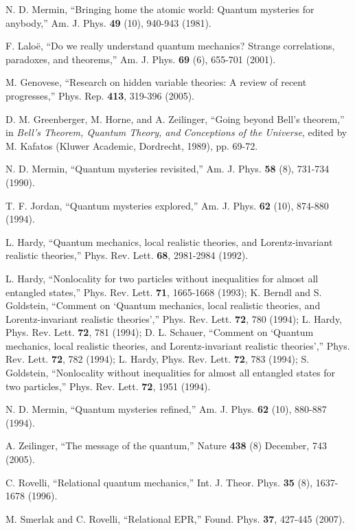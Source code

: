 \documentclass[12pt]{article}
\begin{document}
\begin{thebibliography}{99}
N. D. Mermin,
``Bringing home the atomic world: Quantum mysteries for anybody,''
Am. J. Phys. {\bf 49} (10), 940-943 (1981).

F. Lalo\"e,
``Do we really understand quantum mechanics?
Strange correlations, paradoxes, and theorems,''
Am. J. Phys. {\bf 69} (6), 655-701 (2001).

M. Genovese,
``Research on hidden variable theories: A review of recent progresses,''
Phys. Rep. {\bf 413}, 319-396 (2005).

D. M. Greenberger, M. Horne, and A. Zeilinger,
``Going beyond Bell's theorem,''
in {\it Bell's Theorem, Quantum Theory, and Conceptions 
of the Universe}, edited by M. Kafatos (Kluwer Academic, Dordrecht, 1989),
pp. 69-72. 

N. D. Mermin,
``Quantum mysteries revisited,''
Am. J. Phys. {\bf 58} (8), 731-734 (1990).

T. F. Jordan,
``Quantum mysteries explored,''
Am. J. Phys. {\bf 62} (10), 874-880 (1994).

L. Hardy,
``Quantum mechanics, local realistic theories, and 
Lorentz-invariant realistic theories,''
Phys. Rev. Lett. {\bf 68}, 2981-2984 (1992). 

%
L. Hardy,
``Nonlocality for two particles without inequalities for almost all
entangled states,''
Phys. Rev. Lett. {\bf 71}, 1665-1668 (1993);
%
K. Berndl and S. Goldstein, 
``Comment on `Quantum mechanics, local realistic theories, and 
Lorentz-invariant realistic theories',''
Phys. Rev. Lett. {\bf 72}, 780 (1994);
L. Hardy,
Phys. Rev. Lett. {\bf 72}, 781 (1994); 
%
D. L. Schauer,
``Comment on `Quantum mechanics, local realistic theories, and
Lorentz-invariant realistic theories',''
Phys. Rev. Lett. {\bf 72}, 782 (1994);
L. Hardy,
Phys. Rev. Lett. {\bf 72}, 783 (1994);
%
S. Goldstein,
``Nonlocality without inequalities for almost all entangled states 
for two particles,''
Phys. Rev. Lett. {\bf 72}, 1951 (1994).

N. D. Mermin, 
``Quantum mysteries refined,''
Am. J. Phys. {\bf 62} (10), 880-887 (1994).

A. Zeilinger,
``The message of the quantum,''
Nature {\bf 438} (8) December, 743 (2005).

C. Rovelli,
``Relational quantum mechanics,''
Int. J. Theor. Phys. {\bf 35} (8), 1637-1678 (1996).

M. Smerlak and C. Rovelli,
``Relational EPR,''
Found. Phys. {\bf 37}, 427-445 (2007).


\end{thebibliography}
\end{document}

